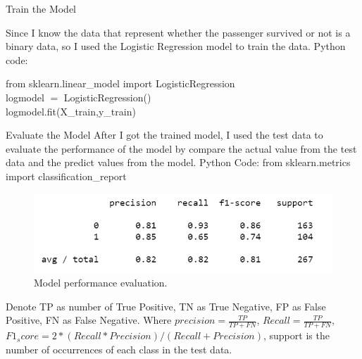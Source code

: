 \documentclass[a4paper,12pt]{article}
\newcommand\tab[1][1cm]{\hspace*{#1}}
\begin{document}
\begin{section}{Train the Model}

Since I know the data that represent whether the passenger survived or not is a binary data, so I used the Logistic Regression model to train the data.
Python code:

 from sklearn.linear\_model import LogisticRegression\\
\tab logmodel $=$ LogisticRegression()\\
\tab logmodel.fit(X\_train,y\_train)\\



\end{section}

\begin{section}{Evaluate the Model}
After I got the trained model, I used the test data to evaluate the performance of the model by compare the actual value from the test data and the predict values from the model.
Python Code:
from sklearn.metrics import classification\_report\\



\begin{figure}
  \includegraphics[width=\textwidth]{result.png}
	\caption{Model performance evaluation.}
\end{figure}

Denote TP as number of True Positive, TN as True Negative, FP as False Positive, FN as False Negative.
Where $precision = \frac{TP}{TP + FN }$, $ Recall = \frac{TP}{TP + FN}$, $F1_score = 2*(Recall * Precision) / (Recall + Precision)$, support  is the number of occurrences of each class in the test data.

\end{section}
\end{document}
